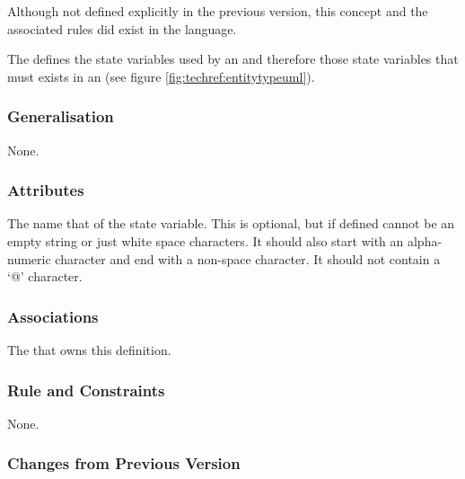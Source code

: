 Although not defined explicitly in the previous version, this concept
and the associated rules did exist in the language.

\label{defn:StateVariableDefinition}

The  defines the state variables
used by an  and therefore those state variables
that must exists in an  (see figure
\ref{fig:techref:entitytypeuml}).

\subsubsection{Generalisation}

None.

\subsubsection{Attributes}

\begin{attributes}
   The name that of the state variable. This
  is optional, but if defined cannot be an empty string or just white
  space characters. It should also start with an alpha-numeric
  character and  end with a non-space character. It should not contain
  a `@' character.
\end{attributes}


\subsubsection{Associations}

\begin{attributes}
   The
   that owns this definition.
\end{attributes}

\subsubsection{Rule and Constraints}

None.

\subsubsection{Changes from Previous Version}

